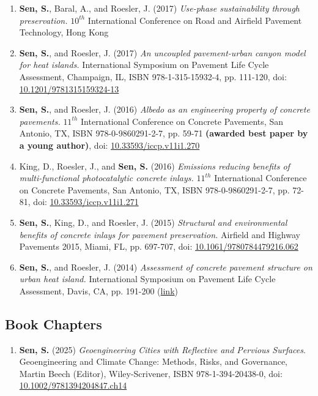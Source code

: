 \documentclass[12pt]{article}
\begin{document}
\begin{enumerate}
	\item \textbf{Sen, S.}, Baral, A., and Roesler, J. (2017) \textit{Use-phase sustainability through preservation.} $10^{th}$ International Conference on Road and Airfield Pavement Technology, Hong Kong
	\item \textbf{Sen, S.}, and Roesler, J. (2017) \textit{An uncoupled pavement-urban canyon model for heat islands.} International Symposium on Pavement Life Cycle Assessment, Champaign, IL, ISBN 978-1-315-15932-4, pp. 111-120, doi: \href{http://dx.doi.org/10.1201/9781315159324-13}{10.1201/9781315159324-13}
	\item \textbf{Sen, S.}, and Roesler, J. (2016) \textit{Albedo as an engineering property of concrete pavements.} $11^{th}$ International Conference on Concrete Pavements, San Antonio, TX, ISBN 978-0-9860291-2-7, pp. 59-71 \textbf{(awarded best paper by a young author)}, doi: \href{http://dx.doi.org/10.33593/iccp.v11i1.270}{10.33593/iccp.v11i1.270}
	\item King, D., Roesler, J., and \textbf{Sen, S.} (2016) \textit{Emissions reducing benefits of multi-functional photocatalytic concrete inlays.} $11^{th}$ International Conference on Concrete Pavements, San Antonio, TX, ISBN 978-0-9860291-2-7, pp. 72-81, doi: \href{http://dx.doi.org/10.33593/iccp.v11i1.271}{10.33593/iccp.v11i1.271}
	\item \textbf{Sen, S.}, King, D., and Roesler, J. (2015) \textit{Structural and environmental benefits of concrete inlays for pavement preservation.} Airfield and Highway Pavements 2015, Miami, FL, pp. 697-707, doi: \href{http://dx.doi.org/10.1061/9780784479216.062}{10.1061/9780784479216.062}
	\item \textbf{Sen, S.}, and Roesler, J. (2014) \textit{Assessment of concrete pavement structure on urban heat island.} International Symposium on Pavement Life Cycle Assessment, Davis, CA, pp. 191-200 (\href{http://www.ucprc.ucdavis.edu/p-LCA2014/media/pdf/Papers/LCA14_Urban\%20Heat\%20Island.pdf}{link})
\end{enumerate}

\hfill
\subsection*{Book Chapters}
\begin{enumerate}
	\item \textbf{Sen, S.} (2025) \textit{Geoengineering Cities with Reflective and Pervious Surfaces}. Geoengineering and Climate Change: Methods, Risks, and Governance, Martin Beech (Editor), Wiley-Scrivener, ISBN 978-1-394-20438-0, doi: \href{http://dx.doi.org/10.1002/9781394204847.ch14}{10.1002/9781394204847.ch14}
\end{enumerate}
\end{document}
